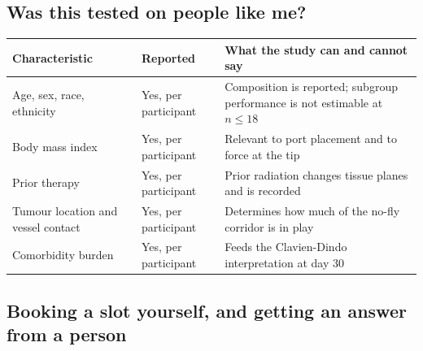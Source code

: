 \vspace{0.30em}


\subsection{Was this tested on people like me?}


\vspace{0.30em}

\noindent\begin{tabularx}{\textwidth}{L{4.7cm} L{3.4cm} Y}
\toprule
\textbf{Characteristic} & \textbf{Reported} & \textbf{What the study can and cannot say} \\
\midrule
Age, sex, race, ethnicity & Yes, per participant & Composition is reported; subgroup performance is not estimable at $n \leq 18$ \\
Body mass index & Yes, per participant & Relevant to port placement and to force at the tip \\
Prior therapy & Yes, per participant & Prior radiation changes tissue planes and is recorded \\
Tumour location and vessel contact & Yes, per participant & Determines how much of the no-fly corridor is in play \\
Comorbidity burden & Yes, per participant & Feeds the Clavien-Dindo interpretation at day 30 \\
\bottomrule
\end{tabularx}

\vspace{0.30em}

\subsection{Booking a slot yourself, and getting an answer from a person}

